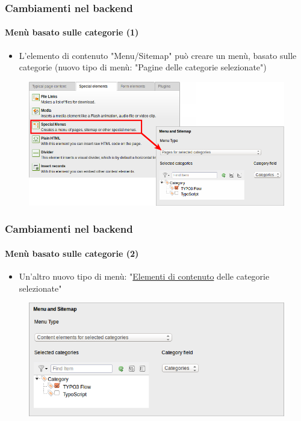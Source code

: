 
\begin{frame}[fragile]
	\frametitle{Cambiamenti nel backend}
	\framesubtitle{Menù basato sulle categorie (1)}

	\begin{itemize}
		\item L'elemento di contenuto "Menu/Sitemap" può creare un menù, basato sulle categorie
			(nuovo tipo di menù: "Pagine delle categorie selezionate")
	\end{itemize}

	\begin{figure}
		\includegraphics[width=0.8\linewidth]{Images/BackendChanges/CategoryBasedMenus.png}
	\end{figure}

\end{frame}


\begin{frame}[fragile]
	\frametitle{Cambiamenti nel backend}
	\framesubtitle{Menù basato sulle categorie (2)}

	\begin{itemize}
		\item Un'altro nuovo tipo di menù: "\underline{Elementi di contenuto} delle categorie selezionate"
	\end{itemize}

	\begin{figure}
		\includegraphics[width=0.6\linewidth]{Images/BackendChanges/ContentElementsForSelectedCategories.png}
	\end{figure}

\end{frame}

